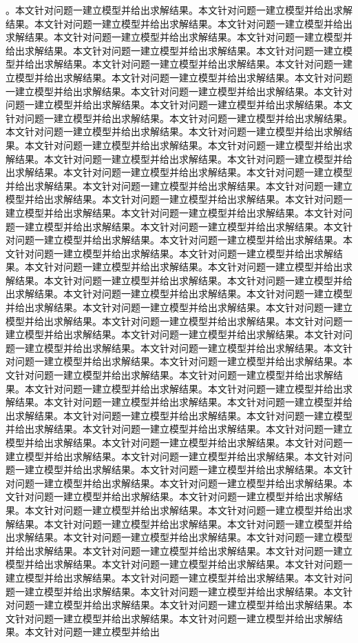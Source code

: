 。本文针对问题一建立模型并给出求解结果。本文针对问题一建立模型并给出求解结果。本文针对问题一建立模型并给出求解结果。本文针对问题一建立模型并给出求解结果。本文针对问题一建立模型并给出求解结果。本文针对问题一建立模型并给出求解结果。本文针对问题一建立模型并给出求解结果。本文针对问题一建立模型并给出求解结果。本文针对问题一建立模型并给出求解结果。本文针对问题一建立模型并给出求解结果。本文针对问题一建立模型并给出求解结果。本文针对问题一建立模型并给出求解结果。本文针对问题一建立模型并给出求解结果。本文针对问题一建立模型并给出求解结果。本文针对问题一建立模型并给出求解结果。本文针对问题一建立模型并给出求解结果。本文针对问题一建立模型并给出求解结果。本文针对问题一建立模型并给出求解结果。本文针对问题一建立模型并给出求解结果。本文针对问题一建立模型并给出求解结果。本文针对问题一建立模型并给出求解结果。本文针对问题一建立模型并给出求解结果。本文针对问题一建立模型并给出求解结果。本文针对问题一建立模型并给出求解结果。本文针对问题一建立模型并给出求解结果。本文针对问题一建立模型并给出求解结果。本文针对问题一建立模型并给出求解结果。本文针对问题一建立模型并给出求解结果。本文针对问题一建立模型并给出求解结果。本文针对问题一建立模型并给出求解结果。本文针对问题一建立模型并给出求解结果。本文针对问题一建立模型并给出求解结果。本文针对问题一建立模型并给出求解结果。本文针对问题一建立模型并给出求解结果。本文针对问题一建立模型并给出求解结果。本文针对问题一建立模型并给出求解结果。本文针对问题一建立模型并给出求解结果。本文针对问题一建立模型并给出求解结果。本文针对问题一建立模型并给出求解结果。本文针对问题一建立模型并给出求解结果。本文针对问题一建立模型并给出求解结果。本文针对问题一建立模型并给出求解结果。本文针对问题一建立模型并给出求解结果。本文针对问题一建立模型并给出求解结果。本文针对问题一建立模型并给出求解结果。本文针对问题一建立模型并给出求解结果。本文针对问题一建立模型并给出求解结果。本文针对问题一建立模型并给出求解结果。本文针对问题一建立模型并给出求解结果。本文针对问题一建立模型并给出求解结果。本文针对问题一建立模型并给出求解结果。本文针对问题一建立模型并给出求解结果。本文针对问题一建立模型并给出求解结果。本文针对问题一建立模型并给出求解结果。本文针对问题一建立模型并给出求解结果。本文针对问题一建立模型并给出求解结果。本文针对问题一建立模型并给出求解结果。本文针对问题一建立模型并给出求解结果。本文针对问题一建立模型并给出求解结果。本文针对问题一建立模型并给出求解结果。本文针对问题一建立模型并给出求解结果。本文针对问题一建立模型并给出求解结果。本文针对问题一建立模型并给出求解结果。本文针对问题一建立模型并给出求解结果。本文针对问题一建立模型并给出求解结果。本文针对问题一建立模型并给出求解结果。本文针对问题一建立模型并给出求解结果。本文针对问题一建立模型并给出求解结果。本文针对问题一建立模型并给出求解结果。本文针对问题一建立模型并给出求解结果。本文针对问题一建立模型并给出求解结果。本文针对问题一建立模型并给出求解结果。本文针对问题一建立模型并给出求解结果。本文针对问题一建立模型并给出求解结果。本文针对问题一建立模型并给出求解结果。本文针对问题一建立模型并给出求解结果。本文针对问题一建立模型并给出求解结果。本文针对问题一建立模型并给出求解结果。本文针对问题一建立模型并给出求解结果。本文针对问题一建立模型并给出求解结果。本文针对问题一建立模型并给出求解结果。本文针对问题一建立模型并给出求解结果。本文针对问题一建立模型并给出求解结果。本文针对问题一建立模型并给出求解结果。本文针对问题一建立模型并给出求解结果。本文针对问题一建立模型并给出求解结果。本文针对问题一建立模型并给出求解结果。本文针对问题一建立模型并给出